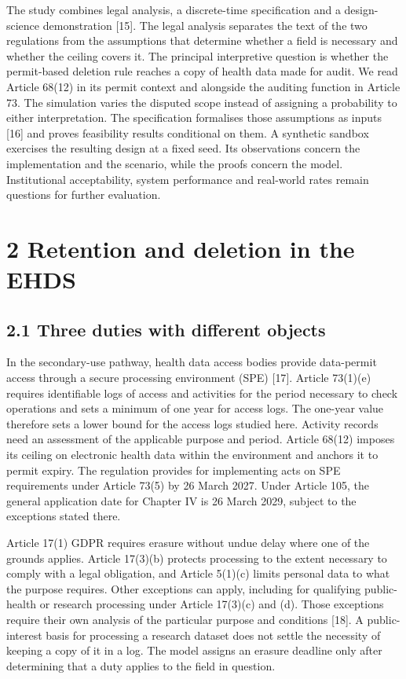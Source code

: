 \documentclass[5p,twocolumn]{elsarticle}
\begin{document}
The study combines legal analysis, a discrete-time specification and a
design-science demonstration {[}15{]}. The legal analysis separates the
text of the two regulations from the assumptions that determine whether
a field is necessary and whether the ceiling covers it. The principal
interpretive question is whether the permit-based deletion rule reaches
a copy of health data made for audit. We read Article 68(12) in its
permit context and alongside the auditing function in Article 73. The
simulation varies the disputed scope instead of assigning a probability
to either interpretation. The specification formalises those assumptions
as inputs {[}16{]} and proves feasibility results conditional on them. A
synthetic sandbox exercises the resulting design at a fixed seed. Its
observations concern the implementation and the scenario, while the
proofs concern the model. Institutional acceptability, system
performance and real-world rates remain questions for further
evaluation.

\hypertarget{retention-and-deletion-in-the-ehds}{%
\section{2 Retention and deletion in the
EHDS}\label{retention-and-deletion-in-the-ehds}}

\hypertarget{three-duties-with-different-objects}{%
\subsection{2.1 Three duties with different
objects}\label{three-duties-with-different-objects}}

In the secondary-use pathway, health data access bodies provide
data-permit access through a secure processing environment (SPE)
{[}17{]}. Article 73(1)(e) requires identifiable logs of access and
activities for the period necessary to check operations and sets a
minimum of one year for access logs. The one-year value therefore sets a
lower bound for the access logs studied here. Activity records need an
assessment of the applicable purpose and period. Article 68(12) imposes
its ceiling on electronic health data within the environment and anchors
it to permit expiry. The regulation provides for implementing acts on
SPE requirements under Article 73(5) by 26 March 2027. Under Article
105, the general application date for Chapter IV is 26 March 2029,
subject to the exceptions stated there.

Article 17(1) GDPR requires erasure without undue delay where one of the
grounds applies. Article 17(3)(b) protects processing to the extent
necessary to comply with a legal obligation, and Article 5(1)(c) limits
personal data to what the purpose requires. Other exceptions can apply,
including for qualifying public-health or research processing under
Article 17(3)(c) and (d). Those exceptions require their own analysis of
the particular purpose and conditions {[}18{]}. A public-interest basis
for processing a research dataset does not settle the necessity of
keeping a copy of it in a log. The model assigns an erasure deadline
only after determining that a duty applies to the field in question.
\end{document}

